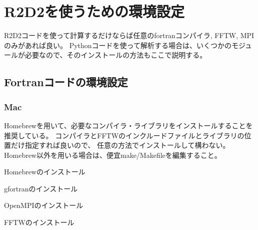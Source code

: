 \documentclass[letterpaper,10pt,dvipdfmx,report]{sphinxmanual}
\begin{document}
\chapter{R2D2を使うための環境設定}
\label{\detokenize{environment:r2d2}}\label{\detokenize{environment::doc}}
R2D2コードを使って計算するだけならば任意のfortranコンパイラ, FFTW, MPIのみがあれば良い。
Pythonコードを使って解析する場合は、いくつかのモジュールが必要なので、そのインストールの方法もここで説明する。


\section{Fortranコードの環境設定}
\label{\detokenize{environment:fortran}}

\subsection{Mac}
\label{\detokenize{environment:mac}}
Homebrewを用いて、必要なコンパイラ・ライブラリをインストールすることを推奨している。
コンパイラとFFTWのインクルードファイルとライブラリの位置だけ指定すれば良いので、
任意の方法でインストールして構わない。Homebrew以外を用いる場合は、便宜make/Makefileを編集すること。

Homebrewのインストール

\begin{sphinxVerbatim}[commandchars=\\\{\}]
  
\end{sphinxVerbatim}

gfortranのインストール

\begin{sphinxVerbatim}[commandchars=\\\{\}]
  
\end{sphinxVerbatim}

OpenMPIのインストール

\begin{sphinxVerbatim}[commandchars=\\\{\}]
  
\end{sphinxVerbatim}

FFTWのインストール

\begin{sphinxVerbatim}[commandchars=\\\{\}]
  
\end{sphinxVerbatim}
\end{document}
